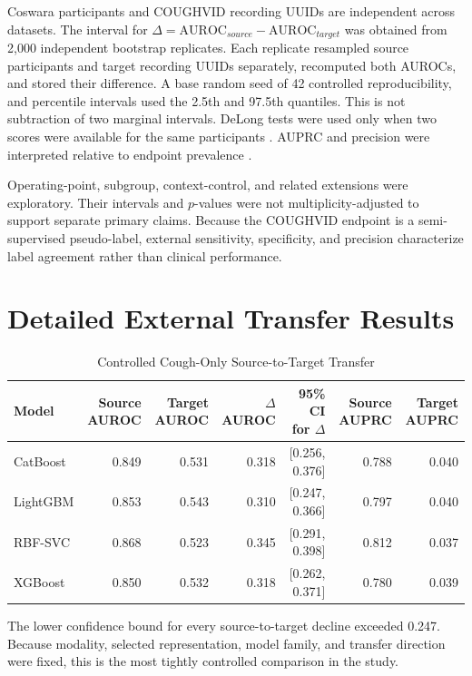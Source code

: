 \documentclass[journal]{IEEEtran}
\newcommand{\auroc}{\mathrm{AUROC}}
\begin{document}
Coswara participants and COUGHVID recording UUIDs are independent across datasets. The interval for $\Delta=\auroc_{source}-\auroc_{target}$ was obtained from 2,000 independent bootstrap replicates. Each replicate resampled source participants and target recording UUIDs separately, recomputed both AUROCs, and stored their difference. A base random seed of 42 controlled reproducibility, and percentile intervals used the 2.5th and 97.5th quantiles. This is not subtraction of two marginal intervals. DeLong tests were used only when two scores were available for the same participants \cite{delong1988roc}. AUPRC and precision were interpreted relative to endpoint prevalence \cite{saito2015auprc}.

Operating-point, subgroup, context-control, and related extensions were exploratory. Their intervals and $p$-values were not multiplicity-adjusted to support separate primary claims. Because the COUGHVID endpoint is a semi-supervised pseudo-label, external sensitivity, specificity, and precision characterize label agreement rather than clinical performance.

\section{Detailed External Transfer Results}

\begin{table}[t]
\caption{Controlled Cough-Only Source-to-Target Transfer}
\label{tab:s_external}
\centering
\footnotesize
\begin{tabular}{lrrrrrr}
\toprule
Model & Source AUROC & Target AUROC & $\Delta$ AUROC & 95\% CI for $\Delta$ & Source AUPRC & Target AUPRC \\
\midrule
CatBoost & 0.849 & 0.531 & 0.318 & [0.256, 0.376] & 0.788 & 0.040 \\
LightGBM & 0.853 & 0.543 & 0.310 & [0.247, 0.366] & 0.797 & 0.040 \\
RBF-SVC & 0.868 & 0.523 & 0.345 & [0.291, 0.398] & 0.812 & 0.037 \\
XGBoost & 0.850 & 0.532 & 0.318 & [0.262, 0.371] & 0.780 & 0.039 \\
\bottomrule
\end{tabular}
\end{table}

The lower confidence bound for every source-to-target decline exceeded 0.247. Because modality, selected representation, model family, and transfer direction were fixed, this is the most tightly controlled comparison in the study.
\end{document}
